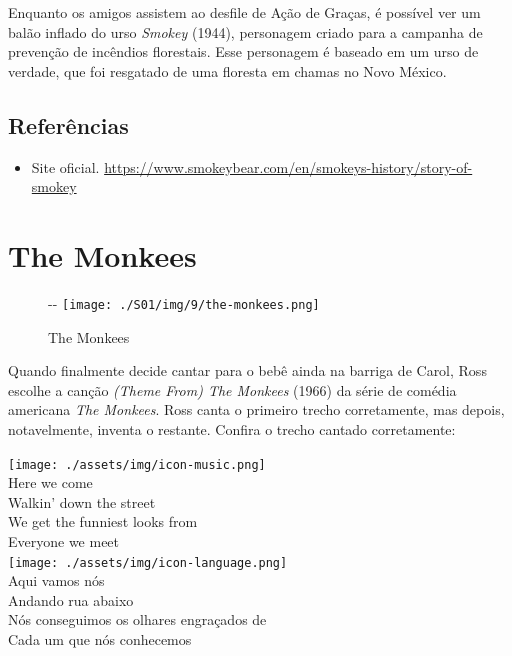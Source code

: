Enquanto os amigos assistem ao desfile de Ação de Graças, é possível ver
um balão inflado do urso \emph{Smokey} (1944), personagem criado para a
campanha de prevenção de incêndios florestais. Esse personagem é baseado
em um urso de verdade, que foi resgatado de uma floresta em chamas no
Novo México.

\hypertarget{referuxeancias-4}{%
\subsection{Referências}\label{referuxeancias-4}}

\begin{itemize}
\tightlist
\item
  \sloppy Site oficial. \url{https://www.smokeybear.com/en/smokeys-history/story-of-smokey}
\end{itemize}

\hypertarget{the-monkees}{%
\section{The Monkees}\label{the-monkees}}

\begin{figure}[!ht]
  \begin{adjustwidth}{-\oddsidemargin-1in}{-\rightmargin}
    \centering
    \texttt{[image: ./S01/img/9/the-monkees.png]}
    \caption{The Monkees\label{fig:the-monkees}}
  \end{adjustwidth}
\end{figure}

Quando finalmente decide cantar para o bebê ainda na barriga de Carol,
Ross escolhe a canção \emph{(Theme From) The Monkees} (1966) da série de
comédia americana \emph{The Monkees}. Ross canta o primeiro trecho
corretamente, mas depois, notavelmente, inventa o restante. Confira o
trecho cantado corretamente:

\bigskip
\begin{tcolorbox}[enhanced,
    drop fuzzy shadow southeast, boxrule=0.3pt,
    lower separated=false, sidebyside, sidebyside align=top,
    halign=flush right, halign lower=left,
    colframe=black!30!dialogoBorder,colback=musicaBg]
\texttt{[image: ./assets/img/icon-music.png]}\\
Here we come\\Walkin’ down the street\\We get the funniest looks from\\Everyone we meet\\
\tcblower
\texttt{[image: ./assets/img/icon-language.png]}\\
Aqui vamos nós\\Andando rua abaixo\\Nós conseguimos os olhares engraçados de\\Cada um que nós conhecemos\\
\end{tcolorbox}

